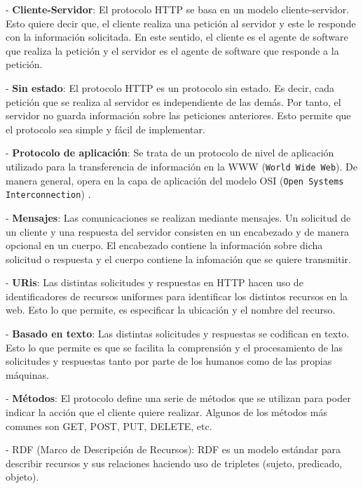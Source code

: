 \documentclass[11pt]{report}
\begin{document}
\indent \indent \indent - \textbf{Cliente-Servidor}: El protocolo HTTP se basa en un modelo cliente-servidor. Esto quiere decir que, el cliente realiza una petición al servidor y este le responde con la información solicitada. En este sentido, el cliente es el agente de software que realiza la petición y el servidor es el agente de software que responde a la petición.

\indent \indent \indent - \textbf{Sin estado}: El protocolo HTTP es un protocolo sin estado. Es decir, cada petición que se realiza al servidor es independiente de las demás. Por tanto, el servidor no guarda información sobre las peticiones anteriores. Esto permite que el protocolo sea simple y fácil de implementar.

\indent \indent \indent - \textbf{Protocolo de aplicación}: Se trata de un protocolo de nivel de aplicación utilizado para la transferencia de información en la WWW (\texttt{World Wide Web}). De manera general, opera en la capa de aplicación del modelo OSI (\texttt{Open Systems Interconnection}) \cite{1}. 

\indent \indent \indent - \textbf{Mensajes}: Las comunicaciones se realizan mediante mensajes. Un solicitud de un cliente y una respuesta del servidor consisten en un encabezado y de manera opcional en un cuerpo. El encabezado contiene la información sobre dicha solicitud o respuesta y el cuerpo contiene la infomación que se quiere transmitir.

\indent \indent \indent - \textbf{URis}: Las distintas solicitudes y respuestas en HTTP hacen uso de identificadores de recursos uniformes para identificar los distintos recursos en la web. Esto lo que permite, es especificar la ubicación y el nombre del recurso.

\indent \indent \indent - \textbf{Basado en texto}: Las distintas solicitudes y respuestas se codifican en texto.  Esto lo que permite es que se facilita la comprensión y el procesamiento de las solicitudes y respuestas tanto por parte de los humanos como de las propias máquinas.

\indent \indent \indent - \textbf{Métodos}: El protocolo define una serie de métodos que se utilizan para poder indicar la acción que el cliente quiere realizar. Algunos de los métodos más comunes son GET, POST, PUT, DELETE, etc.

- RDF (Marco de Descripción de Recursos): RDF es un modelo estándar para describir recursos y sus relaciones haciendo uso de tripletes (sujeto, predicado, objeto).
\end{document}

